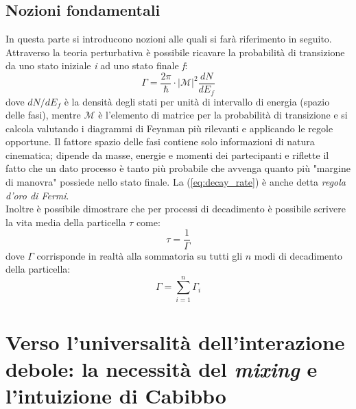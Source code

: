 \documentclass{subnucbo}
\begin{document}
\subsection{Nozioni fondamentali}
In questa parte si introducono nozioni alle quali si farà riferimento in seguito.\\
Attraverso la teoria perturbativa è possibile ricavare la probabilità di transizione da uno stato iniziale \textit{i} ad uno stato finale \textit{f}:
\begin{equation}
        \Gamma = \frac{2 \pi} {\hbar} \cdot | \mathcal{M}|^{2} \frac{dN}{dE_{f}}
        \label{eq:decay_rate}
\end{equation}
dove $dN/dE_{f}$ è la densità degli stati per unità di intervallo di energia (spazio delle fasi), mentre $\mathcal{M}$ è l'elemento di matrice per la probabilità di transizione e si calcola valutando i diagrammi di Feynman più rilevanti e applicando le regole opportune. Il fattore spazio delle fasi contiene solo informazioni di natura cinematica; dipende da masse, energie e momenti dei partecipanti e riflette il fatto che un dato processo è tanto più probabile che avvenga quanto più "margine di manovra" possiede nello stato finale. La (\ref{eq:decay_rate}) è anche detta \textit{regola d'oro di Fermi}. \\
Inoltre è possibile dimostrare \cite{ref:griff} che per processi di decadimento è possibile scrivere la vita media della particella $\tau$ come:
\begin{equation}
        \tau = \frac{1}{\Gamma}
        \label{eq:tau}
\end{equation}
dove $\Gamma$ corrisponde in realtà alla sommatoria su tutti gli $n$ modi di decadimento della particella:
\begin{equation}
        \Gamma = \sum _ { i = 1 } ^ { n } \Gamma _ { i }
        \label{eq:gamma_sum}
\end{equation}

\section{Verso l'universalità dell'interazione debole: la necessità del \textit{mixing} e l'intuizione di Cabibbo}
\end{document}
